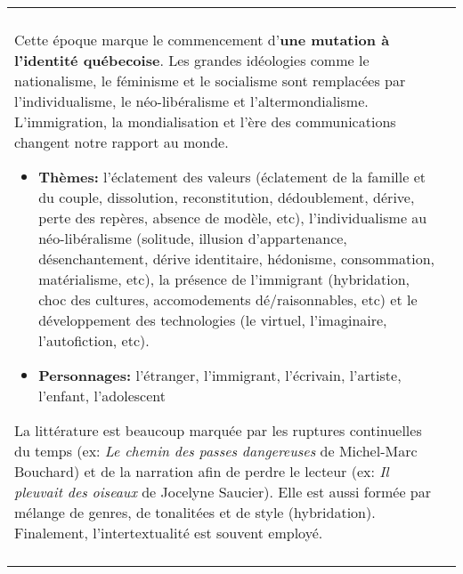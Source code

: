 \documentclass[11pt]{article}
\newcommand{\titre}[1]{{\Large\textbf{#1}}}
\begin{document}
\begin{tabularx}{\textwidth}{@{}XX@{}}
  \begin{minipage}[t]{\linewidth\fboxsep\fboxrule}
    \titre{Postmodernité (1980 à aujourd'huie)}\\
    Cette époque marque le commencement d'\textbf{une mutation à l'identité québecoise}. Les grandes idéologies comme le nationalisme, le féminisme et le socialisme sont remplacées par l'individualisme, le néo-libéralisme et l'altermondialisme. L'immigration, la mondialisation et l'ère des communications changent notre rapport au monde.
    \begin{itemize}
      \item\textbf{Thèmes:} l'éclatement des valeurs (éclatement de la famille et du couple, dissolution, reconstitution, dédoublement, dérive, perte des repères, absence de modèle, etc), l'individualisme au néo-libéralisme (solitude, illusion d'appartenance, désenchantement, dérive identitaire, hédonisme, consommation, matérialisme, etc), la présence de l'immigrant (hybridation, choc des cultures, accomodements dé/raisonnables, etc) et le développement des technologies (le virtuel, l'imaginaire, l'autofiction, etc). 
      \item\textbf{Personnages:} l'étranger, l'immigrant, l'écrivain, l'artiste, l'enfant, l'adolescent
    \end{itemize}
    La littérature est beaucoup marquée par les ruptures continuelles du temps (ex: \textit{Le chemin des passes dangereuses} de Michel-Marc Bouchard) et de la narration afin de perdre le lecteur (ex: \textit{Il pleuvait des oiseaux} de Jocelyne Saucier). Elle est aussi formée par mélange de genres, de tonalitées et de style (hybridation). Finalement, l'intertextualité est souvent employé.\\
  \end{minipage}\\
\end{tabularx}
\pagebreak
\end{document}
